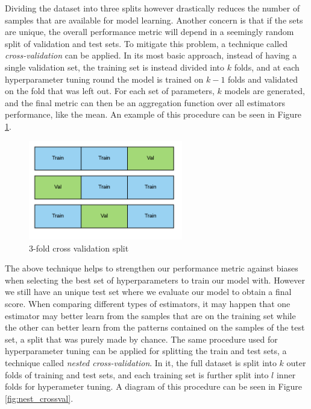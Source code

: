\documentclass{kththesis}
\begin{document}
Dividing the dataset into three splits however drastically reduces the number of samples that are available for model learning. Another concern is that if the sets are unique, the overall performance metric will depend in a seemingly random split of validation and test sets. To mitigate this problem, a technique called \emph{cross-validation} can be applied. In its most basic approach, instead of having a single validation set, the training set is instead divided into $k$ folds, and at each hyperparameter tuning round the model is trained on $k-1$ folds and validated on the fold that was left out. For each set of parameters, $k$ models are generated, and the final metric can then be an aggregation function over all estimators performance, like the mean. An example of this procedure can be seen in Figure \ref{fig:crossval}.

	\begin{figure}[h]
    \centering
    \includegraphics[width=0.6\textwidth, natwidth=400bp, natheight=200bp]{figures/crossval.png}
    \caption{3-fold cross validation split}
    \label{fig:crossval}
	\end{figure}

The above technique helps to strengthen our performance metric against biases when selecting the best set of hyperparameters to train our model with. However we still have an unique test set where we evaluate our model to obtain a final score. When comparing different types of estimators, it may happen that one estimator may better learn from the samples that are on the training set while the other can better learn from the patterns contained on the samples of the test set, a split that was purely made by chance. The same procedure used for hyperparameter tuning can be applied for splitting the train and test sets, a technique called \emph{nested cross-validation}. In it, the full dataset is split into $k$ outer folds of training and test sets, and each training set is further split into $l$ inner folds for hyperameter tuning. A diagram of this procedure can be seen in Figure \ref{fig:nest_crossval}.
\end{document}
